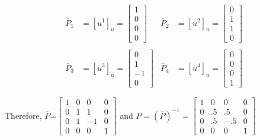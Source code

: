     \begin{align*}
        \overline{P}_{1}&=[\overline{u}^{1}]_{u}=\left[\begin{array}{r}
            1\\
            0\\
            0\\
            0
        \end{array}\right] &
        \overline{P}_{2}&=[\overline{u}^{2}]_{u}=\left[\begin{array}{r}
            0\\
            1\\
            1\\
            0
        \end{array}\right] \\
        \\
        \overline{P}_{3}&=[\overline{u}^{3}]_{u}=\left[\begin{array}{r}
            0\\
            1\\
            -1\\
            0
        \end{array}\right] &
        \overline{P}_{4}&=[\overline{u}^{4}]_{u}=\left[\begin{array}{r}
            0\\
            0\\
            0\\
            1
        \end{array}\right]
    \end{align*}
    \vspace*{.2cm}
    
    Therefore, $\overline{P}$=$\left[\begin{array}{rrrr}
        1 & 0 & 0 & 0\\
        0 & 1 & 1 & 0\\
        0 & 1 & -1 & 0\\
        0 & 0 & 0 & 1
    \end{array}\right]$ and $P=(\overline{P})^{-1} = \left[\begin{array}{rrrr}
        1 & 0 & 0 & 0\\
        0 & .5 & .5 & 0\\
        0& .5 & -.5 & 0\\
        0 & 0 & 0 & 1
    \end{array}\right]$    

\vspace*{.2in}

